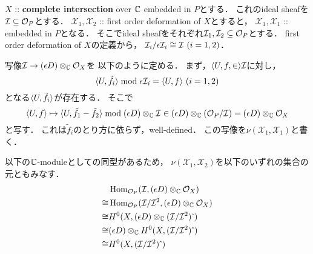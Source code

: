 \documentclass[a4paper]{jsarticle}
\newcommand{\famX}{\mathcal{X}}
\begin{document}
    \subsection{\tp{$\nu(\famX_1, \famX_2)$}{v(X1,X2)}}
    \begin{Def}
        $X$ :: \textbf{complete intersection} over $\mathbb{C}$ embedded in $P$とする．
        これのideal sheafを$\mathcal{I} \subseteq \mathcal{O}_P$とする．
        $\famX_1, \famX_2$ :: first order deformation of $X$とすると，
        $\famX_1, \famX_1$ :: embedded in $P$となる．
        そこでideal sheafをそれぞれ$\mathcal{I}_1, \mathcal{I}_2 \subseteq \mathcal{O}_P$とする．
        first order deformation of $X$の定義から，
        $\shI_i/\epsilon \shI_i \iso \shI \ (i=1,2)$．

        写像$\mathcal{I} \to (\epsilon D) \otimes_{\mathbb{C}} \mathcal{O}_X$を
        以下のように定める．
        まず，$\langle U, f,\in \rangle \mathcal{I}$に対し，
        \[ \langle U,\tilde{f}_i \rangle \bmod \epsilon \mathcal{I}_i=\langle U,f \rangle \ (i=1,2) \]
        となる$\langle U,\tilde{f}_i \rangle$が存在する．
        そこで
        \[
            \langle U,f \rangle
            \mapsto
            \langle U,\tilde{f}_1-\tilde{f}_2 \rangle \bmod (\epsilon D) \otimes_{\mathbb{C}} \mathcal{I}
            \in (\epsilon D) \otimes_{\mathbb{C}} (\mathcal{O}_P/\mathcal{I})=(\epsilon D) \otimes_{\mathbb{C}} \mathcal{O}_X
        \]
        と写す．
        これは$\tilde{f}_i$のとり方に依らず，well-defined．
        この写像を$\nu(\famX_1, \famX_1)$と書く．

        以下の$\mathbb{C}$-moduleとしての同型があるため，
        $\nu(\famX_1, \famX_2)$を以下のいずれの集合の元ともみなす．
        \begin{align*}
            {}&   \operatorname{Hom}_{\mathcal{O}_P}(\mathcal{I}, (\epsilon D) \otimes_{\mathbb{C}} \mathcal{O}_X) \\
            \cong& \operatorname{Hom}_{\mathcal{O}_P}(\mathcal{I}/\mathcal{I}^2, (\epsilon D) \otimes_{\mathbb{C}} \mathcal{O}_X) \\
            \cong& H^0(X, (\epsilon D) \otimes_{\mathbb{C}} (\mathcal{I}/\mathcal{I}^2)\,\hat{}\,) \\
            \cong& (\epsilon D) \otimes_{\mathbb{C}} H^0(X, (\mathcal{I}/\mathcal{I}^2)\,\hat{}\,) \\
            \cong& H^0(X, (\mathcal{I}/\mathcal{I}^2)\,\hat{}\,)
        \end{align*}
    \end{Def}
\end{document}
